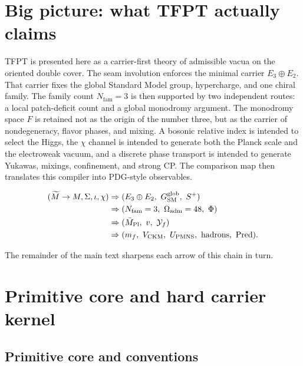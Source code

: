 \section{Big picture: what TFPT actually claims}

TFPT is presented here as a carrier-first theory of admissible vacua on the oriented double cover. The seam involution enforces the minimal carrier $E_3\oplus E_2$. That carrier fixes the global Standard Model group, hypercharge, and one chiral family. The family count $N_{\mathrm{fam}}=3$ is then supported by two independent routes: a local patch-deficit count and a global monodromy argument. The monodromy space $F$ is retained not as the origin of the number three, but as the carrier of nondegeneracy, flavor phases, and mixing. A bosonic relative index is intended to select the Higgs, the $\chi$ channel is intended to generate both the Planck scale and the electroweak vacuum, and a discrete phase transport is intended to generate Yukawas, mixings, confinement, and strong CP. The comparison map then translates this compiler into PDG-style observables.

\begin{tcolorbox}[colback=blue!3, colframe=blue!50!black, breakable,
    title={\textbf{Carrier-first compiler chain}}, fonttitle=\bfseries]
\begin{equation}
\label{eq:compiler-chain}
\begin{aligned}
(\widetilde M\to M,\Sigma,\iota,\chi)
&\Rightarrow
(E_3\oplus E_2,\ G_{\mathrm{SM}}^{\mathrm{glob}},\ S^+)\\
&\Rightarrow
(N_{\mathrm{fam}}=3,\ \Omega_{\mathrm{adm}}=48,\ \Phi)\\
&\Rightarrow
(\bar M_{\mathrm{Pl}},\ v,\ \mathcal Y_f)\\
&\Rightarrow
(m_f,\ V_{\mathrm{CKM}},\ U_{\mathrm{PMNS}},\ \text{hadrons},\ \operatorname{Pred}).
\end{aligned}
\end{equation}
\end{tcolorbox}

The remainder of the main text sharpens each arrow of this chain in turn.

\section{Primitive core and hard carrier kernel}

\subsection{Primitive core and conventions}

